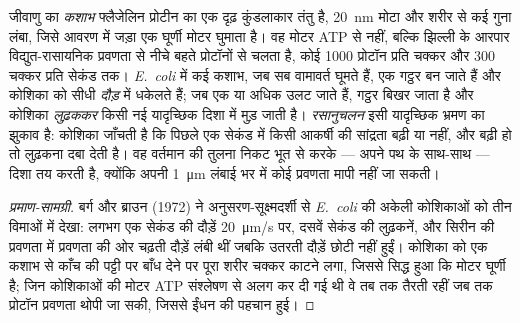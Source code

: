 \begin{proposition}[जीवाणु का कशाभ और रसानुचलन]\label{prop:b2:unicellular-diversity:flagellum}
जीवाणु का \emph{कशाभ} फ्लैजेलिन प्रोटीन का एक दृढ़ कुंडलाकार तंतु है,
\qty{20}{nm} मोटा और शरीर से कई गुना लंबा, जिसे आवरण में जड़ा एक घूर्णी
मोटर घुमाता है। वह मोटर ATP से नहीं, बल्कि झिल्ली के आरपार विद्युत-रासायनिक
प्रवणता से नीचे बहते प्रोटॉनों से चलता है, कोई \num{1000} प्रोटॉन प्रति
चक्कर और \num{300} चक्कर प्रति सेकंड तक। \emph{E.~coli} में कई कशाभ, जब
सब वामावर्त घूमते हैं, एक गट्ठर बन जाते हैं और कोशिका को सीधी
\emph{दौड़} में धकेलते हैं; जब एक या अधिक उलट जाते हैं, गट्ठर बिखर जाता
है और कोशिका \emph{लुढ़ककर} किसी नई यादृच्छिक दिशा में मुड़ जाती है।
\emph{रसानुचलन} इसी यादृच्छिक भ्रमण का झुकाव है: कोशिका जाँचती है कि
पिछले एक सेकंड में किसी आकर्षी की सांद्रता बढ़ी या नहीं, और बढ़ी हो तो
लुढ़कना दबा देती है। वह वर्तमान की तुलना निकट भूत से करके --- अपने पथ के
साथ-साथ --- दिशा तय करती है, क्योंकि अपनी \qty{1}{\micro m} लंबाई भर में
कोई प्रवणता मापी नहीं जा सकती।
\end{proposition}
\begin{proof}[प्रमाण-सामग्री]
बर्ग और ब्राउन (1972) ने अनुसरण-सूक्ष्मदर्शी से \emph{E.~coli} की अकेली
कोशिकाओं को तीन विमाओं में देखा: लगभग एक सेकंड की दौड़ें
\qty{20}{\micro m/s} पर, दसवें सेकंड की लुढ़कनें, और सिरीन की प्रवणता में
प्रवणता की ओर चढ़ती दौड़ें लंबी थीं जबकि उतरती दौड़ें छोटी नहीं हुईं।
कोशिका को एक कशाभ से काँच की पट्टी पर बाँध देने पर पूरा शरीर चक्कर काटने
लगा, जिससे सिद्ध हुआ कि मोटर घूर्णी है; जिन कोशिकाओं की मोटर ATP संश्लेषण
से अलग कर दी गई थी वे तब तक तैरती रहीं जब तक प्रोटॉन प्रवणता थोपी जा सकी,
जिससे ईंधन की पहचान हुई।
\end{proof}

